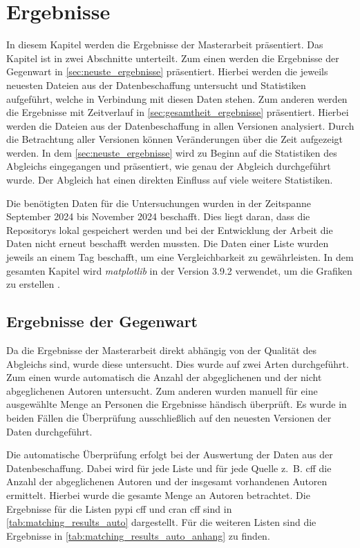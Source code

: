 \chapter{Ergebnisse}
\label{chap:ergebnisse}
In diesem Kapitel werden die Ergebnisse der Masterarbeit präsentiert.
Das Kapitel ist in zwei Abschnitte unterteilt.
Zum einen werden die Ergebnisse der Gegenwart in \autoref{sec:neuste_ergebnisse} präsentiert.
Hierbei werden die jeweils neuesten Dateien aus der Datenbeschaffung untersucht und Statistiken aufgeführt, welche in Verbindung mit diesen Daten stehen.
Zum anderen werden die Ergebnisse mit Zeitverlauf in \autoref{sec:gesamtheit_ergebnisse} präsentiert.
Hierbei werden die Dateien aus der Datenbeschaffung in allen Versionen analysiert.
Durch die Betrachtung aller Versionen können Veränderungen über die Zeit aufgezeigt werden.
In dem \autoref{sec:neuste_ergebnisse} wird zu Beginn auf die Statistiken des Abgleichs eingegangen und präsentiert, wie genau der Abgleich durchgeführt wurde.
Der Abgleich hat einen direkten Einfluss auf viele weitere Statistiken.

Die benötigten Daten für die Untersuchungen wurden in der Zeitspanne September 2024 bis November 2024 beschafft.
Dies liegt daran, dass die Repositorys lokal gespeichert werden und bei der Entwicklung der Arbeit die Daten nicht erneut beschafft werden mussten.
Die Daten einer Liste wurden jeweils an einem Tag beschafft, um eine Vergleichbarkeit zu gewährleisten.
In dem gesamten Kapitel wird \emph{matplotlib} in der Version 3.9.2 verwendet, um die Grafiken zu erstellen \autocite{hunter_matplotlib_2007}.

\section{Ergebnisse der Gegenwart}
\label{sec:neuste_ergebnisse}
Da die Ergebnisse der Masterarbeit direkt abhängig von der Qualität des Abgleichs sind, wurde diese untersucht.
Dies wurde auf zwei Arten durchgeführt.
Zum einen wurde automatisch die Anzahl der abgeglichenen und der nicht abgeglichenen Autoren untersucht.
Zum anderen wurden manuell für eine ausgewählte Menge an Personen die Ergebnisse händisch überprüft.
Es wurde in beiden Fällen die Überprüfung ausschließlich auf den neuesten Versionen der Daten durchgeführt.

Die automatische Überprüfung erfolgt bei der Auswertung der Daten aus der Datenbeschaffung.
Dabei wird für jede Liste und für jede Quelle z. B. \gls{cff} die Anzahl der abgeglichenen Autoren und der insgesamt vorhandenen Autoren ermittelt.
Hierbei wurde die gesamte Menge an Autoren betrachtet.
Die Ergebnisse für die Listen \gls{pypi} \gls{cff} und \gls{cran} \gls{cff} sind in \autoref{tab:matching_results_auto} dargestellt.
Für die weiteren Listen sind die Ergebnisse in \autoref{tab:matching_results_auto_anhang} zu finden.


